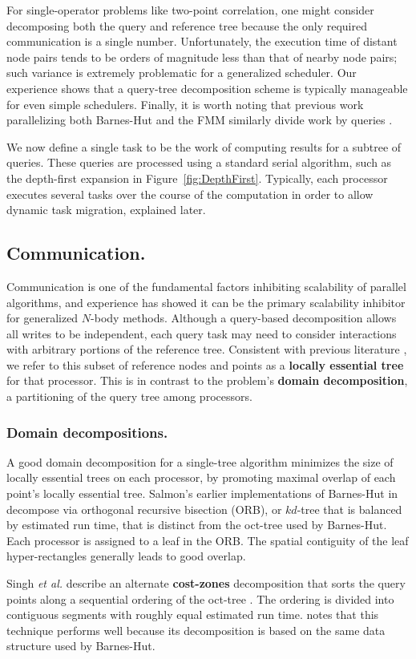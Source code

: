 \documentclass[twoside,leqno,twocolumn]{article}
\newcommand{\fig}[1]{Figure~\ref{fig:#1}}
\newcommand{\mysubsub}[1]{\subsubsection{#1.}}
\newcommand{\mysub}[1]{\subsection{#1.}}
\newcommand{\defterm}[1]{{\bf #1}}
\begin{document}
For single-operator problems like two-point correlation, one might consider decomposing both the query and reference tree because the only required communication is a single number.
Unfortunately, the execution time of distant node pairs tends to be orders of magnitude less than that of nearby node pairs; such variance is extremely problematic for a generalized scheduler.
Our experience shows that a query-tree decomposition scheme is typically manageable for even simple schedulers.
Finally, it is worth noting that previous work parallelizing both Barnes-Hut and the FMM similarly divide work by queries \cite{liu94experiences, salmon_thesis, singh_thesis}.

We now define a single task to be the work of computing results for a subtree of queries.
These queries are processed using a standard serial algorithm, such as the depth-first expansion in \fig{DepthFirst}.
Typically, each processor executes several tasks over the course of the computation in order to allow dynamic task migration, explained later.

\mysub{Communication}

Communication is one of the fundamental factors inhibiting scalability of parallel algorithms, and experience has showed it can be the primary scalability inhibitor for generalized $N$-body methods.
Although a query-based decomposition allows all writes to be independent, each query task may need to consider interactions with arbitrary portions of the reference tree.
Consistent with previous literature \cite{salmon_thesis, singh_thesis}, we refer to this subset of reference nodes and points as a \defterm{locally essential tree} for that processor.
This is in contrast to the problem's \defterm{domain decomposition}, a partitioning of the query tree among processors.

\mysubsub{Domain decompositions}
A good domain decomposition for a single-tree algorithm minimizes the size of locally essential trees on each processor, by promoting maximal overlap of each point's locally essential tree.
Salmon's earlier implementations of Barnes-Hut in \cite{salmon_thesis} decompose via orthogonal recursive bisection (ORB), or $kd$-tree that is balanced by estimated run time, that is distinct from the oct-tree used by Barnes-Hut.
Each processor is assigned to a leaf in the ORB.
The spatial contiguity of the leaf hyper-rectangles generally leads to good overlap.

Singh {\it et al.} describe an alternate \defterm{cost-zones} decomposition that sorts the query points along a sequential ordering of the oct-tree \cite{singh95load}.
The ordering is divided into contiguous segments with roughly equal estimated run time.
\cite{singh95load} notes that this technique performs well because its decomposition is based on the same data structure used by Barnes-Hut.
\end{document}
